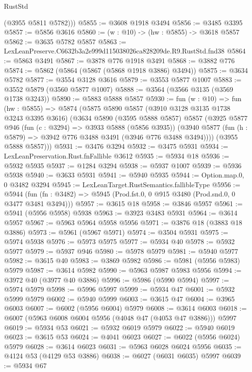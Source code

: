 \begin{lexlean}{RustStd}
\begin{coremodule}
        (@3955 @5811 @5782)))
@5855 := @3608 @1918 @3494
@5856 := @3485 @3395
@5857 := @5856 @3616
@5860 := (w : @10) -> (hw : @5855) -> @3618 @5857
@5862 := @3635 @5782 @5857
@5863 := LexLeanPreserve.C6632b3a2e999d115038026ca828209de.R9.RustStd.fnd38
@5864 := @5863 @3491
@5867 := @3878 @776 @1918 @3491
@5868 := @3882 @776
@5874 := @5862 (@5864 (@5867 (@5868 @1918 @3886) @3494))
@5875 := @3634 @5782
@5877 := @3554 @3128 @3616
@5879 := @3553 @5877 @1007
@5883 := @3552 @5879 (@3560 @5877 @1007)
@5888 := @3564 (@3566 @3135 (@3569 @1738 @3243))
@5890 := @5883 @5888 @5857
@5930 := fun (w : @10) =>
  fun (hw : @5855) =>
  @5874
    (@5875
      @5890
      @5857
      (@3910 @3128 @3135 @1738 @3243 @3395 @3616)
      (@3634
        @5890
        (@3595 @5888 @5857)
        @5857
        (@3925
          @5877
          @946
          (fun (c : @3294) => @3933 @5888 (@5856 @3935))
          (@3940 @5877 (fun (h : @5879) => @3942 @776 @3488 @3491 (@3946 @776 @3488 @3494))))
        (@3955 @5888 @5857)))
@5931 := @3476 @3294
@5932 := @3475 @5931
@5934 := LexLeanPreservation.Rust.fnFallible @3612
@5935 := @5934 @18
@5936 := @5932 @5935
@5937 := @1284 @3294
@5938 := @5937 @1007
@5939 := @5936 @5938
@5940 := @3633 @5931
@5941 := @5940 @5935
@5944 := Option.map.{0, 0} @3482 @3294
@5945 := LexLeanTarget.RustSemantics.fallibleType
@5956 := @5944
    (fun (fn : @3482) => @5945 (Prod.fst.{0, 0} @915 @3480 (Prod.snd.{0, 0} @3477 @3481 @3494)))
@5957 := @3615 @18
@5958 := @3846 @5957
@5961 := @5941 (@5956 @5958) @5938
@5963 := @3923 @3483 @5931
@5964 := @3614 @5957
@5967 := @5963 @5964 @5958 @5956
@5971 := @3876 @18 (@3883 @18 @3886)
@5973 := @5961 (@5967 @5971)
@5974 := @3504 @5931
@5975 := @5974 @5938
@5976 := @5973 @5975
@5977 := @5934 @40
@5978 := @5932 @5977
@5979 := @5937 @946
@5980 := @5978 @5979
@5981 := @5940 @5977
@5982 := @3615 @40
@5983 := @3869 @5982
@5986 := @5981 (@5956 @5983) @5979
@5987 := @3614 @5982
@5990 := @5963 @5987 @5983 @5956
@5994 := @3972 @40 (@3977 @40 @3886)
@5996 := @5986 (@5990 @5994)
@5997 := @5974 @5979
@5998 := @5996 @5997
@5999 := @5934 @47
@6001 := @5932 @5999 @5979
@6002 := @5940 @5999
@6003 := @3615 @47
@6004 := @3965 @6003
@6007 := @6002 (@5956 @6004) @5979
@6008 := @3614 @6003
@6018 := @6007 (@5963 @6008 @6004 @5956 (@4048 @47 (@4053 @47 @3886))) @5997
@6019 := @5934 @53
@6021 := @5932 @6019 @5979
@6022 := @5940 @6019
@6023 := @3615 @53
@6024 := @4041 @6023
@6027 := @6022 (@5956 @6024) @5979
@6028 := @3614 @6023
@6031 := @5963 @6028 @6024 @5956
@6035 := @4124 @53 (@4129 @53 @3886)
@6038 := @6027 (@6031 @6035) @5997
@6039 := @5934 @67

\end{coremodule}
\end{lexlean}
